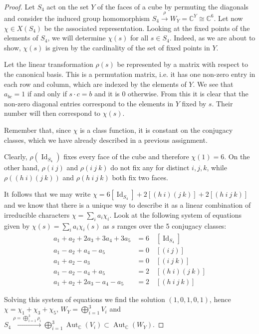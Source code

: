 \documentclass{article}
\newcommand{\numberset}{\mathbb}
\newcommand{\C}{\numberset{C}}
\newcommand{\exercise}[1]{\noindent {\bf Exercise #1}}
\DeclareMathOperator{\Id}{Id}
\DeclareMathOperator{\Aut}{Aut}
\begin{document}
~\\
\exercise{9.5}

\begin{proof}
    Let $S_4$ act on the set $Y$ of the faces of a cube by permuting the
    diagonals and consider the induced group homomorphism
    $S_4\xrightarrow{\rho}W_Y=\C^Y\cong\C^6$. Let now $\chi\in X(S_4)$ be the
    associated representation. Looking at
    the fixed points of the elements of $S_4$, we will determine
    $\chi(s)$ for all $s\in S_4$. Indeed, as we are about to show, $\chi(s)$
    is given by the cardinality of the set of fixed points in $Y$.

    Let the linear transformation $\rho(s)$ be represented by a matrix with
    respect to the canonical basis. This is a permutation matrix, i.e. it has
    one non-zero entry in each row and column, which are indexed by the elements
    of $Y$. We see that $a_{bc}=1$ if and only if $s\cdot c=b$ and it is 0
    otherwise. From this it is clear that the non-zero diagonal entries
    correspond to the elements in $Y$ fixed by $s$. Their number will then
    correspond to $\chi(s)$.

    Remember that, since $\chi$ is a class function, it is constant on the
    conjugacy classes, which we have already described in a previous assignment.
    
    Clearly, $\rho(\Id_{S_4})$ fixes every face of the cube and therefore
    $\chi(1)=6$. On the other hand, $\rho(i\ j)$ and $\rho(i\ j\ k)$ do not fix
    any for distinct $i,j,k$, while $\rho((h\ i)(j\ k))$ and $\rho(h\ i\ j\ k)$
    both fix two faces.

    It follows that we may write $\chi=6[\Id_{S_4}]+2[(h\ i)(j\ k)]+2[(h\ i\ j\
    k)]$ and we know that there is a unique way to describe it as a linear
    combination of irreducible characters $\chi=\sum_ia_i\chi_i$. Look at the
    following system of equations given by $\chi(s)=\sum_ia_i\chi_i(s)$ as $s$
    ranges over the 5 conjugacy classes:
    \begin{align*}
        a_1+a_2+2a_3+3a_4+3a_5 &=6\quad [\Id_{S_4}] \\
        a_1-a_2+a_4-a_5 &=0\quad [(i\ j)] \\
        a_1+a_2-a_3 &=0\quad [(i\ j\ k)] \\
        a_1-a_2-a_4+a_5 &=2\quad [(h\ i)(j\ k)] \\
        a_1+a_2+2a_3-a_4-a_5 &=2\quad [(h\ i\ j\ k)]
    \end{align*}

    Solving this system of equations we find the solution $(1,0,1,0,1)$, hence
    $\chi=\chi_1+\chi_3+\chi_5$, $W_Y=\bigoplus_{i=1}^3V_i$ and
    $S_4\xrightarrow{\rho=\bigoplus_{i=1}^3\rho_i}
    \bigoplus_{i=1}^3\Aut_\C(V_i)\subset\Aut_\C(W_Y)$.
\end{proof}
\end{document}
